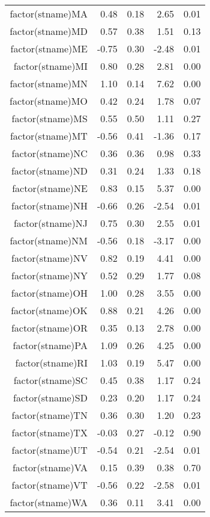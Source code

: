 \begin{table}[ht]
\begin{tabular}{rrrrr}
  factor(stname)MA & 0.48 & 0.18 & 2.65 & 0.01 \\ 
  factor(stname)MD & 0.57 & 0.38 & 1.51 & 0.13 \\ 
  factor(stname)ME & -0.75 & 0.30 & -2.48 & 0.01 \\ 
  factor(stname)MI & 0.80 & 0.28 & 2.81 & 0.00 \\ 
  factor(stname)MN & 1.10 & 0.14 & 7.62 & 0.00 \\ 
  factor(stname)MO & 0.42 & 0.24 & 1.78 & 0.07 \\ 
  factor(stname)MS & 0.55 & 0.50 & 1.11 & 0.27 \\ 
  factor(stname)MT & -0.56 & 0.41 & -1.36 & 0.17 \\ 
  factor(stname)NC & 0.36 & 0.36 & 0.98 & 0.33 \\ 
  factor(stname)ND & 0.31 & 0.24 & 1.33 & 0.18 \\ 
  factor(stname)NE & 0.83 & 0.15 & 5.37 & 0.00 \\ 
  factor(stname)NH & -0.66 & 0.26 & -2.54 & 0.01 \\ 
  factor(stname)NJ & 0.75 & 0.30 & 2.55 & 0.01 \\ 
  factor(stname)NM & -0.56 & 0.18 & -3.17 & 0.00 \\ 
  factor(stname)NV & 0.82 & 0.19 & 4.41 & 0.00 \\ 
  factor(stname)NY & 0.52 & 0.29 & 1.77 & 0.08 \\ 
  factor(stname)OH & 1.00 & 0.28 & 3.55 & 0.00 \\ 
  factor(stname)OK & 0.88 & 0.21 & 4.26 & 0.00 \\ 
  factor(stname)OR & 0.35 & 0.13 & 2.78 & 0.00 \\ 
  factor(stname)PA & 1.09 & 0.26 & 4.25 & 0.00 \\ 
  factor(stname)RI & 1.03 & 0.19 & 5.47 & 0.00 \\ 
  factor(stname)SC & 0.45 & 0.38 & 1.17 & 0.24 \\ 
  factor(stname)SD & 0.23 & 0.20 & 1.17 & 0.24 \\ 
  factor(stname)TN & 0.36 & 0.30 & 1.20 & 0.23 \\ 
  factor(stname)TX & -0.03 & 0.27 & -0.12 & 0.90 \\ 
  factor(stname)UT & -0.54 & 0.21 & -2.54 & 0.01 \\ 
  factor(stname)VA & 0.15 & 0.39 & 0.38 & 0.70 \\ 
  factor(stname)VT & -0.56 & 0.22 & -2.58 & 0.01 \\ 
  factor(stname)WA & 0.36 & 0.11 & 3.41 & 0.00 \\ 

\end{tabular}
\end{table}

